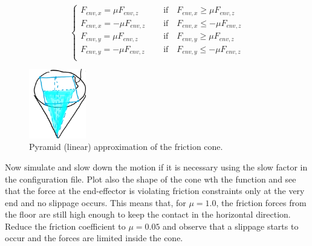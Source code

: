 \documentclass[11pt]{article}
\begin{document}
\begin{equation*}
\begin{cases}
F_{env, x} = \mu F_{env, z}  \quad &\text{   if}\quad F_{env, x} \geq \mu F_{env, z} \\ 
F_{env, x} = -\mu F_{env, z}  \quad &\text{   if}\quad F_{env, x} \leq -\mu F_{env, z} \\ 
F_{env, y} = \mu F_{env, z}  \quad &\text{   if}\quad F_{env, y} \geq \mu F_{env, z} \\ 
F_{env, y} = -\mu F_{env, z}  \quad &\text{   if}\quad F_{env, y} \leq -\mu F_{env, z} \\ 
\end{cases}
\end{equation*}
%
 \begin{figure}[bht]
 	\centering
 	\includegraphics[width=2.5cm]{pics/fcone2.png}
 	\caption{Pyramid (linear) approximation of the friction cone.}
 	\label{fig:fcone}
 \end{figure}
Now simulate and slow down the motion if it is necessary using the slow factor in the configuration file. 
Plot also the shape of the cone wth the  function and  see that the force at the end-effector is violating friction constraints only at the very end and no slippage occurs. This means that, for $\mu = 1.0$, the friction forces from the floor are still high enough to keep the contact in the horizontal direction.  Reduce the friction coefficient to $\mu = 0.05$ and observe that a slippage starts to occur and the forces are limited inside the cone.  
% 
\end{document}
